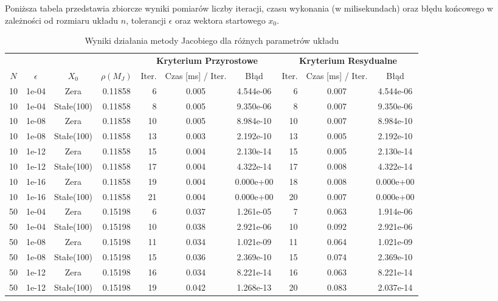 \documentclass[twoside]{article}
\begin{document}
Poniższa tabela przedstawia zbiorcze wyniki pomiarów liczby iteracji, czasu wykonania (w milisekundach) oraz błędu końcowego w zależności od
rozmiaru układu $n$, tolerancji $\epsilon$ oraz wektora startowego $x_0$.

\begin{table}[H]
\centering
\caption{Wyniki działania metody Jacobiego dla różnych parametrów układu}
\vspace{2mm}
\footnotesize
\begin{tabular}{c c c c r c c r c c}
\toprule
& & & & \multicolumn{3}{c}{\textbf{Kryterium Przyrostowe}} & \multicolumn{3}{c}{\textbf{Kryterium Resydualne}} \\
\cmidrule(lr){5-7} \cmidrule(lr){8-10}
$N$ & $\epsilon$ & $X_0$ & $\rho(M_J)$ & Iter. & Czas [ms] / Iter. & Błąd & Iter. & Czas [ms] / Iter. & Błąd \\
\midrule
10 & 1e-04 & Zera & 0.11858 & 6 & 0.005 & 4.544e-06 & 6 & 0.007 & 4.544e-06 \\
10 & 1e-04 & Stałe(100) & 0.11858 & 8 & 0.005 & 9.350e-06 & 8 & 0.007 & 9.350e-06 \\
10 & 1e-08 & Zera & 0.11858 & 10 & 0.005 & 8.984e-10 & 10 & 0.007 & 8.984e-10 \\
10 & 1e-08 & Stałe(100) & 0.11858 & 13 & 0.003 & 2.192e-10 & 13 & 0.005 & 2.192e-10 \\
10 & 1e-12 & Zera & 0.11858 & 15 & 0.004 & 2.130e-14 & 15 & 0.005 & 2.130e-14 \\
10 & 1e-12 & Stałe(100) & 0.11858 & 17 & 0.004 & 4.322e-14 & 17 & 0.008 & 4.322e-14 \\
10 & 1e-16 & Zera & 0.11858 & 19 & 0.004 & 0.000e+00 & 18 & 0.008 & 0.000e+00 \\
10 & 1e-16 & Stałe(100) & 0.11858 & 21 & 0.004 & 0.000e+00 & 20 & 0.007 & 0.000e+00 \\
\midrule
50 & 1e-04 & Zera & 0.15198 & 6 & 0.037 & 1.261e-05 & 7 & 0.063 & 1.914e-06 \\
50 & 1e-04 & Stałe(100) & 0.15198 & 10 & 0.038 & 2.921e-06 & 10 & 0.092 & 2.921e-06 \\
50 & 1e-08 & Zera & 0.15198 & 11 & 0.034 & 1.021e-09 & 11 & 0.064 & 1.021e-09 \\
50 & 1e-08 & Stałe(100) & 0.15198 & 15 & 0.036 & 2.369e-10 & 15 & 0.074 & 2.369e-10 \\
50 & 1e-12 & Zera & 0.15198 & 16 & 0.034 & 8.221e-14 & 16 & 0.063 & 8.221e-14 \\
50 & 1e-12 & Stałe(100) & 0.15198 & 19 & 0.042 & 1.268e-13 & 20 & 0.083 & 2.037e-14 \\

\end{tabular}
\end{table}
\end{document}
